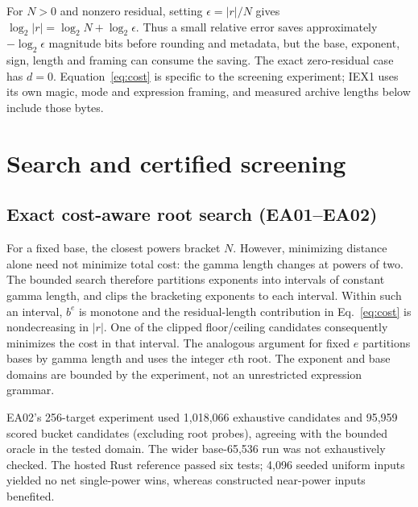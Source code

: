 \documentclass[11pt,a4paper]{article}
\begin{document}
For $N>0$ and nonzero residual, setting $\epsilon=|r|/N$ gives $\log_2|r|=\log_2 N+\log_2\epsilon$. Thus a small relative error saves approximately $-\log_2\epsilon$ magnitude bits before rounding and metadata, but the base, exponent, sign, length and framing can consume the saving. The exact zero-residual case has $d=0$. Equation~\eqref{eq:cost} is specific to the screening experiment; IEX1 uses its own magic, mode and expression framing, and measured archive lengths below include those bytes.

\section{Search and certified screening}
\subsection{Exact cost-aware root search (EA01--EA02)}
For a fixed base, the closest powers bracket $N$. However, minimizing distance alone need not minimize total cost: the gamma length changes at powers of two. The bounded search therefore partitions exponents into intervals of constant gamma length, and clips the bracketing exponents to each interval. Within such an interval, $b^e$ is monotone and the residual-length contribution in Eq.~\eqref{eq:cost} is nondecreasing in $|r|$. One of the clipped floor/ceiling candidates consequently minimizes the cost in that interval. The analogous argument for fixed $e$ partitions bases by gamma length and uses the integer $e$th root. The exponent and base domains are bounded by the experiment, not an unrestricted expression grammar.

EA02's 256-target experiment used 1,018,066 exhaustive candidates and 95,959 scored bucket candidates (excluding root probes), agreeing with the bounded oracle in the tested domain. The wider base-65,536 run was not exhaustively checked. The hosted Rust reference passed six tests; 4,096 seeded uniform inputs yielded no net single-power wins, whereas constructed near-power inputs benefited. \cite{ea02,hosted}
\end{document}
